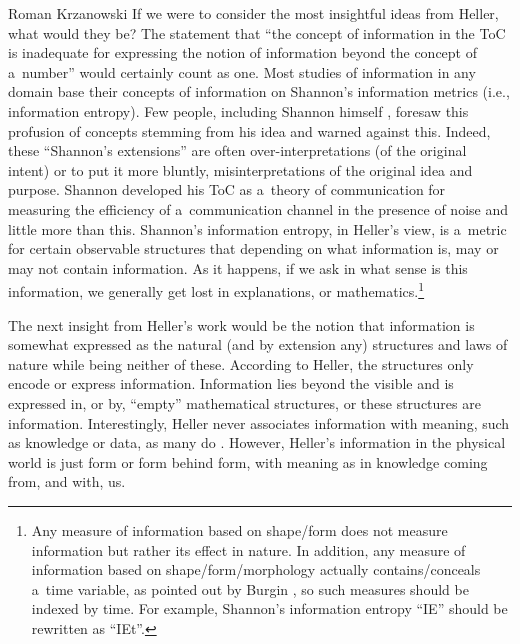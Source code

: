 \begin{artengenv}{Roman Krzanowski}
If we were to consider the most insightful ideas from Heller, what would they be? The statement that ``the concept of information in the ToC is inadequate for expressing the notion of information beyond the concept of a~number'' would certainly count as one. Most studies of information in any domain base their concepts of information on Shannon's information metrics (i.e., information entropy). Few people, including Shannon himself 
\parencite[][]{shannon_bandwagon_1956}, %
 foresaw this profusion of concepts stemming from his idea and warned against this. Indeed, these ``Shannon's extensions'' are often over-interpretations (of the original intent) or to put it more bluntly, misinterpretations of the original idea and purpose. Shannon developed his ToC as a~theory of communication for measuring the efficiency of a~communication channel in the presence of noise and little more than this. Shannon's information entropy, in Heller's view, is a~metric for certain observable structures that depending on what information is, may or may not contain information. As it happens, if we ask in what sense is this information, we generally get lost in explanations, or mathematics.\footnote{Any measure of information based on shape/form does not measure information but rather its effect in nature. In addition, any measure of information based on shape/form/morphology actually contains/conceals a~time variable, as pointed out by Burgin 
\parencite*[][]{burgin_theory_2010}, %
 so such measures should be indexed by time. For example, Shannon's information entropy ``IE'' should be rewritten as ``IEt''.}



The next insight from Heller's work would be the notion that information is somewhat expressed as the natural (and by extension any) structures and laws of nature while being neither of these. According to Heller, the structures only encode or express information. Information lies beyond the visible and is expressed in, or by, ``empty'' mathematical structures, or these structures are information. Interestingly, Heller never associates information with meaning, such as knowledge or data, as many do 
\parencites[e.g][]{losee_discipline_1997}[][]{sveiby_what_1998}[][]{casagrande_information_1999}[][]{dretske_knowledge_1999}[][]{floridi_information_2010}[][]{floridi_philosophy_2011}[][]{floridi_semantic_2019}[][]{lenski_information_2010}[][]{vernon_artificial_2014}. %
 However, Heller's information in the physical world is just form or form behind form, with meaning as in knowledge coming from, and with, us.




\end{artengenv}

